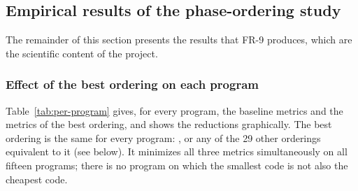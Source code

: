 \subsection*{Empirical results of the phase-ordering study}
\label{sec:empirical}

The remainder of this section presents the results that FR-9 produces, which are the scientific content of the project.

\subsubsection*{Effect of the best ordering on each program}

Table~\ref{tab:per-program} gives, for every program, the baseline metrics and the metrics of the best ordering, and  shows the reductions graphically. The best ordering is the same for every program: , or any of the 29 other orderings equivalent to it (see below). It minimizes all three metrics simultaneously on all fifteen programs; there is no program on which the smallest code is not also the cheapest code.

